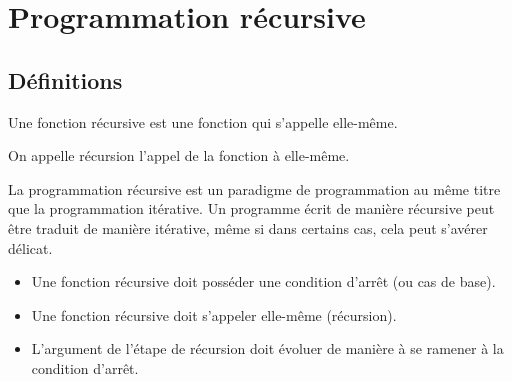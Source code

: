 %
%
%
%
%
%
%
%

\setchapterpreamble[u]{\margintoc}

\chapter{Programmation récursive}
%


\section{Définitions}
\begin{defi}
Une fonction récursive est une fonction qui s'appelle elle-même.

On appelle récursion l'appel de la fonction à elle-même.
\end{defi}

La programmation récursive est un paradigme de programmation au même titre que la programmation itérative. Un programme écrit de manière récursive peut être traduit de manière itérative, même si dans certains cas, cela peut s'avérer délicat.


\begin{methode}
\begin{itemize}
\item Une fonction récursive doit posséder une condition d'arrêt (ou cas de base).
\item Une fonction récursive doit s'appeler elle-même (récursion).
\item L'argument de l'étape de récursion doit évoluer de manière à se ramener à la condition d'arrêt.
\end{itemize}
\end{methode}
 
